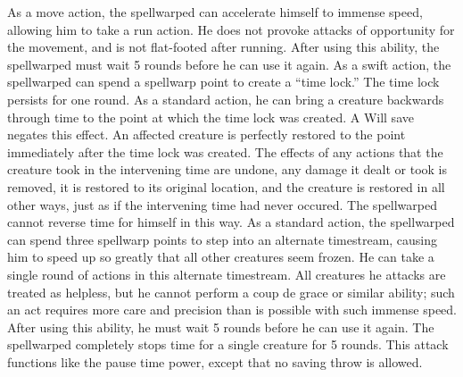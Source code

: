  As a move action, the spellwarped can accelerate himself to immense speed, allowing him to take a run action. He does not provoke attacks of opportunity for the movement, and is not flat-footed after running. After using this ability, the spellwarped must wait 5 rounds before he can use it again.
 As a swift action, the spellwarped can spend a spellwarp point to create a ``time lock.'' The time lock persists for one round. As a standard action, he can bring a creature backwards through time to the point at which the time lock was created. A Will save negates this effect. An affected creature is perfectly restored to the point immediately after the time lock was created. The effects of any actions that the creature took in the intervening time are undone, any damage it dealt or took is removed, it is restored to its original location, and the creature is restored in all other ways, just as if the intervening time had never occured. The spellwarped cannot reverse time for himself in this way.
 As a standard action, the spellwarped can spend three spellwarp points to step into an alternate timestream, causing him to speed up so greatly that all other creatures seem frozen. He can take a single round of actions in this alternate timestream. All creatures he attacks are treated as helpless, but he cannot perform a coup de grace or similar ability; such an act requires more care and precision than is possible with such immense speed. After using this ability, he must wait 5 rounds before he can use it again.
 The spellwarped completely stops time for a single creature for 5 rounds. This attack functions like the pause time power, except that no saving throw is allowed.

